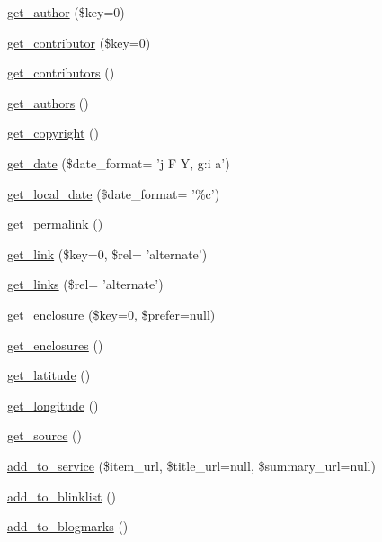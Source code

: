 \begin{DoxyCompactItemize}
\hyperlink{class_simple_pie___item_a3b14f7cda0db98c8a4fcfe00d6ddb75d}{get\-\_\-author} (\$key=0)
\item 
\hyperlink{class_simple_pie___item_aa2e2b0d0004f0f5a7ffda767b25e9b44}{get\-\_\-contributor} (\$key=0)
\item 
\hyperlink{class_simple_pie___item_ab46ee979c09f780a9de0924c4ebc8ad6}{get\-\_\-contributors} ()
\item 
\hyperlink{class_simple_pie___item_a732a9470198f6e4354bb8fa4b41d459f}{get\-\_\-authors} ()
\item 
\hyperlink{class_simple_pie___item_ab1c6d6b1b873db8f0a02f2e6eb725368}{get\-\_\-copyright} ()
\item 
\hyperlink{class_simple_pie___item_a9368de9178c612337900f1d3551c13d6}{get\-\_\-date} (\$date\-\_\-format= 'j F Y, g\-:i a')
\item 
\hyperlink{class_simple_pie___item_ad5fe8de4e3bf39a5a745c6706dc1bec6}{get\-\_\-local\-\_\-date} (\$date\-\_\-format= '\%c')
\item 
\hyperlink{class_simple_pie___item_a6f5d63f10956d34057877283c4af1f8c}{get\-\_\-permalink} ()
\item 
\hyperlink{class_simple_pie___item_a7b8c371e85e2d0e4e99111741af9a70c}{get\-\_\-link} (\$key=0, \$rel= 'alternate')
\item 
\hyperlink{class_simple_pie___item_a03ce7b7fe61ef6a1d673a8d8ef350b0f}{get\-\_\-links} (\$rel= 'alternate')
\item 
\hyperlink{class_simple_pie___item_ac85b2c315eb4406b87f61590599d51af}{get\-\_\-enclosure} (\$key=0, \$prefer=null)
\item 
\hyperlink{class_simple_pie___item_ac1e540310fe97afa7fd20472ffa624b5}{get\-\_\-enclosures} ()
\item 
\hyperlink{class_simple_pie___item_a91815d5778cc5fa7ab4275f7ed3c003e}{get\-\_\-latitude} ()
\item 
\hyperlink{class_simple_pie___item_a81212e7e594171c0ce03ea8da65262de}{get\-\_\-longitude} ()
\item 
\hyperlink{class_simple_pie___item_a3d9748f9c088c5a08aa050e753db8400}{get\-\_\-source} ()
\item 
\hyperlink{class_simple_pie___item_a82710fb354f6cc5b56b155bda777e4e2}{add\-\_\-to\-\_\-service} (\$item\-\_\-url, \$title\-\_\-url=null, \$summary\-\_\-url=null)
\item 
\hyperlink{class_simple_pie___item_a7c0f5d2e809f7c272d0dcf5277ac84a5}{add\-\_\-to\-\_\-blinklist} ()
\item 
\hyperlink{class_simple_pie___item_aa2732c40c8d6c7a07f76300306f00ce5}{add\-\_\-to\-\_\-blogmarks} ()

\end{DoxyCompactItemize}
